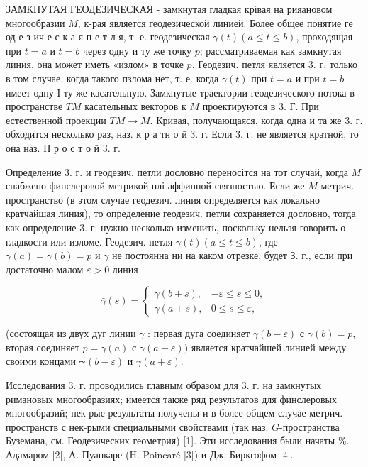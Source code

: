 \documentclass[10pt]{article}
\begin{document}
ЗАМКНУТАЯ ГЕОДЕЗИЧЕСКАЯ - замкнутая гладкая крівая на рияановом многообразии $M$, к-рая является геодезической линией. Более общее понятие ге од е з ич е с к а я п е т л я, т. е. геодезическая $\gamma(t)(a \leqslant t \leqslant b)$, проходящая при $t=a$ и $t=b$ через одну и ту же точку $p$; рассматриваемая как замкнутая линия, она может иметь «излом» в точке $p$. Геодезич. петля является 3. г. только в том случае, когда такого пзлома нет, т. е. когда $\gamma(t)$ при $t=a$ и при $t=b$ имеет одну І ту же касательную. Замкнутые траектории геодезического потока в пространстве $T M$ касательных векторов к $M$ проектируются в 3. Г. При естественной проекции $T M \rightarrow M$. Кривая, получающаяся, когда одна и та же 3. г. обходится несколько раз, наз. к р а тн о й 3. г. Если 3. г. не является кратной, то она наз. П р о с т о й 3. г.



Определение 3. г. и геодезич. петли дословно переносітся на тот случай, когда $M$ снабжено финслеровой метрикой плі аффинной связностью. Если же $M$ метрич. пространство (в этом случае геодезич. линия определяется как локально кратчайшая линия), то определение геодезич. петли сохраняется дословно, тогда как определение 3. г. нужно несколько изменить, поскольку нельзя говорить о гладкости или изломе. Геодезич. петля $\gamma(t)(a \leqslant t \leqslant b)$, где $\gamma(a)=\gamma(b)=p$ и $\gamma$ не постоянна ни на каком отрезке, будет З. г., если при достаточно малом $\varepsilon>0$ линия



\[

\bar{\gamma}(s)= \begin{cases}\gamma(b+s), & -\varepsilon \leqslant s \leqslant 0, \\ \gamma(a+s), & 0 \leqslant s \leqslant \varepsilon,\end{cases}

\]



(состоящая из двух дуг линии $\gamma$ : первая дуга соединяет $\gamma(b-\varepsilon)$ с $\gamma(b)=p$, вторая соединяет $p=\gamma(a)$ с $\gamma(a+\varepsilon))$ является кратчайшей линией между своими концами $\boldsymbol{\gamma}(b-\varepsilon)$ и $\gamma(a+\varepsilon)$.



Исследования 3. г. проводились главным образом для 3. г. на замкнутых римановых многообразиях; имеется также ряд результатов для финслеровых многообразий; нек-рые результаты получены и в более общем случае метрич. пространств с нек-рыми специальными свойствами (так наз. $G$-пространства Буземана, см. Геодезических геометрия) [1]. Эти исследования были начаты \%. Адамаром [2], А. Пуанкаре (H. Poincaré [3]) и Дж. Биркгофом [4].
\end{document}
